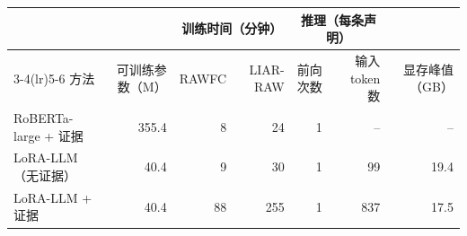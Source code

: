 \begin{tabular}{lrrrrrr}
\toprule
 & & \multicolumn{2}{c}{训练时间（分钟）} & \multicolumn{2}{c}{推理（每条声明）} & \\
\cmidrule(lr){3-4}\cmidrule(lr){5-6}
方法 & 可训练参数（M） & RAWFC & LIAR-RAW & 前向次数 & 输入 token 数 & 显存峰值（GB） \\
\midrule
RoBERTa-large + 证据 & 355.4 & 8 & 24 & 1 & -- & -- \\
LoRA-LLM（无证据） & 40.4 & 9 & 30 & 1 & 99 & 19.4 \\
LoRA-LLM + 证据 & 40.4 & 88 & 255 & 1 & 837 & 17.5 \\
\bottomrule
\end{tabular}
